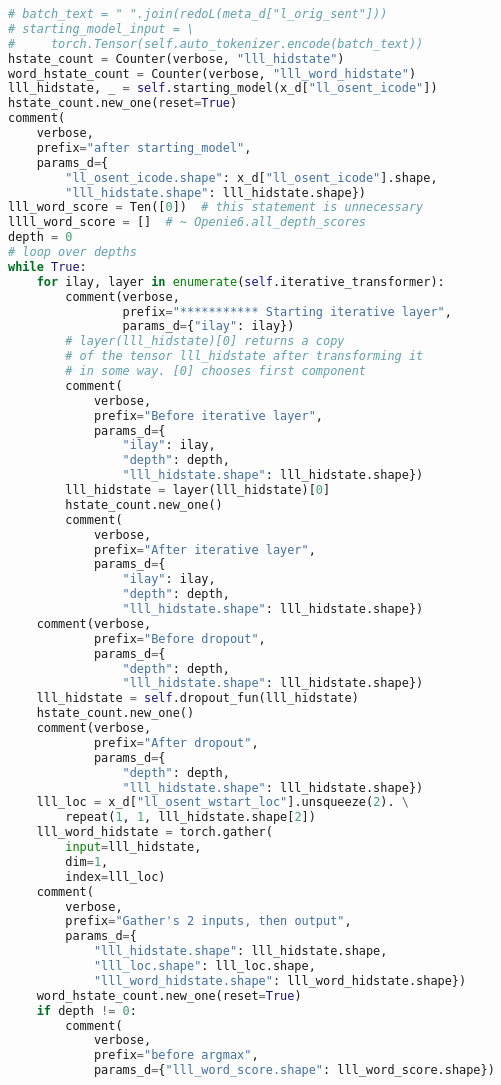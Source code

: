 \documentclass[12pt]{article}
\begin{document}
\begin{lstlisting}[language=Python]
# batch_text = " ".join(redoL(meta_d["l_orig_sent"]))
# starting_model_input = \
#     torch.Tensor(self.auto_tokenizer.encode(batch_text))
hstate_count = Counter(verbose, "lll_hidstate")
word_hstate_count = Counter(verbose, "lll_word_hidstate")
lll_hidstate, _ = self.starting_model(x_d["ll_osent_icode"])
hstate_count.new_one(reset=True)
comment(
    verbose,
    prefix="after starting_model",
    params_d={
        "ll_osent_icode.shape": x_d["ll_osent_icode"].shape,
        "lll_hidstate.shape": lll_hidstate.shape})
lll_word_score = Ten([0])  # this statement is unnecessary
llll_word_score = []  # ~ Openie6.all_depth_scores
depth = 0
# loop over depths
while True:
    for ilay, layer in enumerate(self.iterative_transformer):
        comment(verbose,
                prefix="*********** Starting iterative layer",
                params_d={"ilay": ilay})
        # layer(lll_hidstate)[0] returns a copy
        # of the tensor lll_hidstate after transforming it
        # in some way. [0] chooses first component
        comment(
            verbose,
            prefix="Before iterative layer",
            params_d={
                "ilay": ilay,
                "depth": depth,
                "lll_hidstate.shape": lll_hidstate.shape})
        lll_hidstate = layer(lll_hidstate)[0]
        hstate_count.new_one()
        comment(
            verbose,
            prefix="After iterative layer",
            params_d={
                "ilay": ilay,
                "depth": depth,
                "lll_hidstate.shape": lll_hidstate.shape})
    comment(verbose,
            prefix="Before dropout",
            params_d={
                "depth": depth,
                "lll_hidstate.shape": lll_hidstate.shape})
    lll_hidstate = self.dropout_fun(lll_hidstate)
    hstate_count.new_one()
    comment(verbose,
            prefix="After dropout",
            params_d={
                "depth": depth,
                "lll_hidstate.shape": lll_hidstate.shape})
    lll_loc = x_d["ll_osent_wstart_loc"].unsqueeze(2). \
        repeat(1, 1, lll_hidstate.shape[2])
    lll_word_hidstate = torch.gather(
        input=lll_hidstate,
        dim=1,
        index=lll_loc)
    comment(
        verbose,
        prefix="Gather's 2 inputs, then output",
        params_d={
            "lll_hidstate.shape": lll_hidstate.shape,
            "lll_loc.shape": lll_loc.shape,
            "lll_word_hidstate.shape": lll_word_hidstate.shape})
    word_hstate_count.new_one(reset=True)
    if depth != 0:
        comment(
            verbose,
            prefix="before argmax",
            params_d={"lll_word_score.shape": lll_word_score.shape})

\end{lstlisting}
\end{document}
